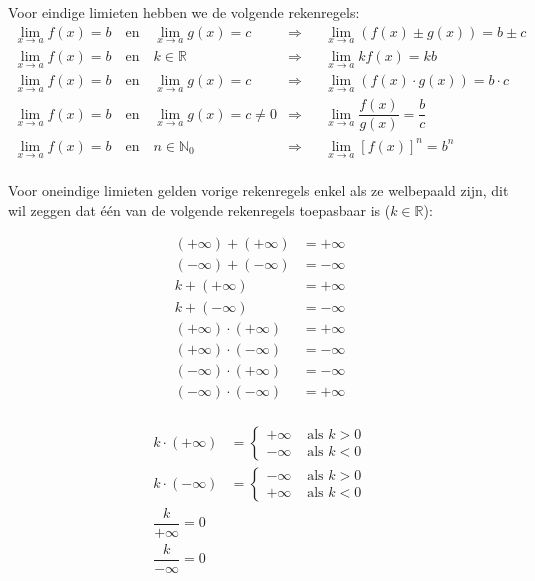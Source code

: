 \documentclass[12pt]{article}
\begin{document}
\begin{theorie}

Voor eindige limieten hebben we de volgende rekenregels:
\begin{align*}
  \displaystyle\lim_{x\to a}f(x)=b\quad\mbox{en}\quad \lim_{x\to a}g(x)=c &\Rightarrow&&\lim_{x\to a}\left(f(x)\pm g(x)\right)=b\pm c\\
  \displaystyle\lim_{x\to a}f(x)=b\quad\mbox{en}\quad k\in\mathbb{R} &\Rightarrow&&\lim_{x\to a} kf(x)=kb\\
  \displaystyle\lim_{x\to a}f(x)=b\quad\mbox{en}\quad \lim_{x\to a}g(x)=c &\Rightarrow&&\lim_{x\to a}\left(f(x)\cdot g(x)\right)=b\cdot c\\
  \displaystyle\lim_{x\to a}f(x)=b\quad\mbox{en}\quad \lim_{x\to a}g(x)=c \neq 0 &\Rightarrow&&\lim_{x\to a}\dfrac{f(x)}{g(x)}=\dfrac{b}{c}\\
  \displaystyle\lim_{x\to a}f(x)=b\quad\mbox{en}\quad n\in\mathbb{N}_0 &\Rightarrow&&\lim_{x\to a} [f(x)]^n=b^n\\
\end{align*}

Voor oneindige limieten gelden vorige rekenregels enkel als ze welbepaald zijn, dit wil zeggen dat één van de volgende rekenregels toepasbaar is ($k\in\mathbb{R}$):

\begin{multicols}{2}
  \begin{align*}
    (+\infty)+(+\infty) &= +\infty\\
    (-\infty)+(-\infty) &= -\infty\\
    k+(+\infty)&=+\infty\\
    k+(-\infty)&=-\infty\\
    (+\infty)\cdot(+\infty) &= +\infty\\
    (+\infty)\cdot(-\infty) &= -\infty\\
    (-\infty)\cdot(+\infty) &= -\infty\\
    (-\infty)\cdot(-\infty) &= +\infty\\
  \end{align*}

  \begin{align*}
    k\cdot(+\infty)&=\begin{cases}+\infty & \mbox{ als } k>0\\-\infty & \mbox{ als } k<0\end{cases}\\
    k\cdot(-\infty)&=\begin{cases}-\infty & \mbox{ als } k>0\\+\infty & \mbox{ als } k<0\end{cases}\\
    \dfrac{k}{+\infty}=0\\
    \dfrac{k}{-\infty}=0\\
  \end{align*}
\end{multicols}


\end{theorie}
\end{document}
